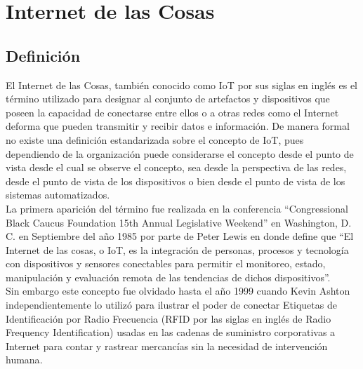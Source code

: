 

\chapter{Internet de las Cosas}

\section{Definición}
El Internet de las Cosas, también conocido como IoT por sus siglas en inglés es el término utilizado para designar al conjunto de artefactos y dispositivos que poseen la capacidad de conectarse entre ellos o a otras redes como el Internet deforma que pueden transmitir y recibir datos e información. De manera formal no existe una definición estandarizada sobre el concepto de IoT, pues dependiendo de la organización puede considerarse el concepto desde el punto de vista desde el cual se observe el concepto, sea desde la perspectiva de las redes, desde el punto de vista de los dispositivos o bien desde el punto de vista de los sistemas automatizados.\\

La primera aparición del término fue realizada en la conferencia ``Congressional Black Caucus Foundation 15th Annual Legislative Weekend'' en Washington, D. C. en Septiembre del año 1985 por parte de Peter Lewis \cite{IoTTrueHistory} en donde define que ``El Internet de las cosas, o IoT, es la integración de personas, procesos y tecnología con dispositivos y sensores conectables para permitir el monitoreo, estado, manipulación y evaluación remota de las tendencias de dichos dispositivos''\cite{IoTFirstDef}.\\

Sin embargo este concepto fue olvidado hasta el año 1999 cuando Kevin Ashton independientemente lo utilizó para ilustrar el poder de conectar Etiquetas de Identificación por Radio Frecuencia (RFID por las siglas en inglés de Radio Frequency Identification) usadas en las cadenas de suministro corporativas a Internet para contar y rastrear mercancías sin la necesidad de intervención humana\cite{iotInternetSociety}.\\

